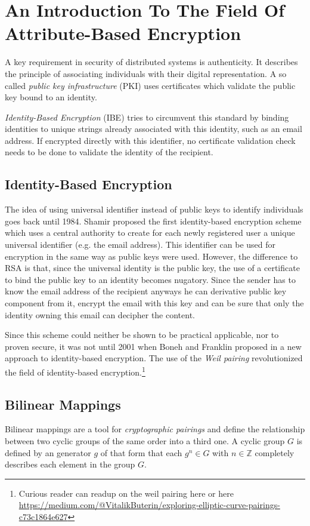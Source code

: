 \section{An Introduction To The Field Of Attribute-Based Encryption}
A key requirement in security of distributed systems is authenticity. It describes the principle of associating individuals with their digital representation. A so called \textit{public key infrastructure} (\ac{PKI}) uses certificates which validate the public key bound to an identity.

\textit{Identity-Based Encryption} (\ac{IBE}) tries to circumvent this standard by binding identities to unique strings already associated with this identity, such as an email address. If encrypted directly with this identifier, no certificate validation check needs to be done to validate the identity of the recipient. 

\subsection{Identity-Based Encryption}
The idea of using universal identifier instead of public keys to identify individuals goes back until 1984. Shamir proposed the first identity-based encryption scheme\cite{shamir1984identity} which uses a central authority to create for each newly registered user a unique universal identifier (e.g. the email address). This identifier can be used for encryption in the same way as public keys were used. However, the difference to \ac{RSA} is that, since the universal identity is the public key, the use of a certificate to bind the public key to an identity becomes nugatory. 
Since the sender has to know the email address of the recipient anyways he can derivative public key component from it, encrypt the email with this key and can be sure that only the identity owning this email can decipher the content. 

Since this scheme could neither be shown to be practical applicable, nor to proven secure, it was not until 2001 when Boneh and Franklin proposed in \cite{boneh2001identity} a new approach to identity-based encryption. The use of the \textit{Weil pairing} revolutionized the field of identity-based encryption.\footnote{Curious reader can readup on the weil pairing here \cite{Miller2004} \cite{galbraith2008pairings} or here \url{https://medium.com/@VitalikButerin/exploring-elliptic-curve-pairings-c73c1864e627}}

\subsection{Bilinear Mappings}
\label{sec:bilinearmappings}
Bilinear mappings are a tool for \textit{cryptographic pairings} and define the relationship between two cyclic groups of the same order into a third one. A cyclic group $G$ is defined by an generator $g$ of that form that each $g^n \in G$ with $n \in \mathbb{Z}$ completely describes each element in the group $G$.

